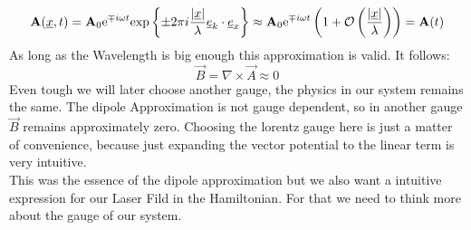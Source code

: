 \begin{equation*}
    \mathbf{A}(\underline{x}, t) = \mathbf{A}_0\mathrm{e}^{\mp i \omega t}\mathrm{exp}\left\{\pm2\pi i\frac{|\underline{x}|}{\lambda}\underline{e}_k \cdot \underline{e}_x\right\} \approx \mathbf{A}_0 \mathrm{e}^{\mp i \omega t}\left(1+\mathcal{O}\left(\frac{|\underline{x}|}{\lambda}\right)\right) = \mathbf{A}(t)
\end{equation*}
As long as the Wavelength is big enough this approximation is valid. It follows:
\begin{equation*}
    \vec{B} = \nabla \times \vec{A} \approx 0
\end{equation*}
Even tough we will later choose another gauge, the physics in our system remains the same. The dipole Approximation is not gauge dependent, so in another gauge $\vec{B}$ remains approximately zero.
Choosing the lorentz gauge here is just a matter of convenience, because just expanding the vector potential to the linear term is very intuitive. \\
This was the essence of the dipole approximation but we also want a intuitive expression for our Laser Fild in the Hamiltonian. 
For that we need to think more about the gauge of our system.






